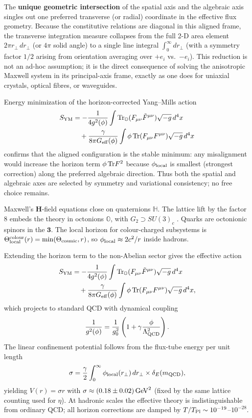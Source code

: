 \documentclass[12pt,a4paper]{article}
\begin{document}
The \textbf{unique geometric intersection} of the spatial axis and the algebraic axis singles out one preferred transverse (or radial) coordinate in the effective flux geometry. Because the constitutive relations are diagonal in this aligned frame, the transverse integration measure collapses from the full 2-D area element $2\pi r_\perp\,dr_\perp$ (or $4\pi$ solid angle) to a single line integral $\int_0^\infty dr_\perp$ (with a symmetry factor $1/2$ arising from orientation averaging over $+e_i$ vs.\ $-e_i$). This reduction is not an ad-hoc assumption; it is the direct consequence of solving the anisotropic Maxwell system in its principal-axis frame, exactly as one does for uniaxial crystals, optical fibres, or waveguides.

Energy minimization of the horizon-corrected Yang--Mills action
\[
\begin{split}
S_{\rm YM} &= -\frac{1}{4g^2(\phi)}\int{\rm Tr}_{\mathbb{O}}(F_{\mu\nu}\tilde{F}^{\mu\nu})\sqrt{-g}\,d^4x \\
&\quad + \frac{\gamma}{8\pi G_{\rm eff}(\phi)}\int\phi\,{\rm Tr}(F_{\mu\nu}F^{\mu\nu})\sqrt{-g}\,d^4x
\end{split}
\]
confirms that the aligned configuration is the stable minimum: any misalignment would increase the horizon term $\phi\,{\rm Tr} F^2$ because $\phi_{\rm local}$ is smallest (strongest correction) along the preferred algebraic direction. Thus both the spatial and algebraic axes are selected by symmetry and variational consistency; no free choice remains.

Maxwell's $\mathbf{H}$-field equations close on quaternions $\mathbb{H}$. The lattice lift by the factor 8 embeds the theory in octonions $\mathbb{O}$, with $G_2\supset SU(3)_c$ \citep{Gunaydin1974,Gunaydin1975,Okubo1978,Dixon1994,Toppan2021}. Quarks are octonionic spinors in the $\mathbf{3}$. The local horizon for colour-charged subsystems is $\Theta_{\rm local}^{\rm colour}(r)=\min(\Theta_{\rm cosmic},r)$, so $\phi_{\rm local}\approx2c^2/r$ inside hadrons.

Extending the horizon term to the non-Abelian sector gives the effective action
\[
\begin{split}
S_{\rm YM} &= -\frac{1}{4g^2(\phi)}\int{\rm Tr}_{\mathbb{O}}(F_{\mu\nu}\tilde{F}^{\mu\nu})\sqrt{-g}\,d^4x \\
&\quad + \frac{\gamma}{8\pi G_{\rm eff}(\phi)}\int\phi\,{\rm Tr}(F_{\mu\nu}F^{\mu\nu})\sqrt{-g}\,d^4x,
\end{split}
\]
which projects to standard QCD with dynamical coupling
\[
\frac{1}{g^2(\phi)} = \frac{1}{g_0^2}\left(1 + \gamma\frac{\phi}{\Lambda_{\rm QCD}^2}\right).
\]
The linear confinement potential follows from the flux-tube energy per unit length
\[
\sigma = \frac{\gamma}{2}\int_0^\infty\phi_{\rm local}(r_\perp)\,dr_\perp\times\delta_E(m_{\rm QCD}),
\]
yielding $V(r)=\sigma r$ with $\sigma\approx(0.18\pm0.02)\,{\rm GeV}^2$ (fixed by the same lattice counting used for $\eta$). At hadronic scales the effective theory is indistinguishable from ordinary QCD; all horizon corrections are damped by $T/T_{\rm Pl}\sim10^{-19}$--$10^{-28}$.
\end{document}
